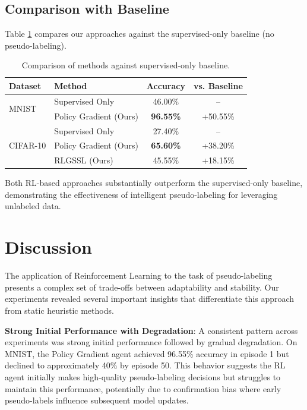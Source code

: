 \documentclass[pdflatex,sn-mathphys-num]{sn-jnl}%
\theoremstyle{thmstyleone}%
\theoremstyle{thmstyletwo}%
\theoremstyle{thmstylethree}%
\begin{document}
\subsection{Comparison with Baseline}
Table \ref{tab:comparison} compares our approaches against the supervised-only baseline (no pseudo-labeling).

\begin{table}[h]
\caption{Comparison of methods against supervised-only baseline.}\label{tab:comparison}
\begin{tabular}{@{}llcc@{}}
\toprule
Dataset & Method & Accuracy & vs. Baseline \\
\midrule
\multirow{2}{*}{MNIST} & Supervised Only & 46.00\% & -- \\
 & Policy Gradient (Ours) & \textbf{96.55\%} & +50.55\% \\
\midrule
\multirow{3}{*}{CIFAR-10} & Supervised Only & 27.40\% & -- \\
 & Policy Gradient (Ours) & \textbf{65.60\%} & +38.20\% \\
 & RLGSSL (Ours) & 45.55\% & +18.15\% \\
\bottomrule
\end{tabular}
\end{table}

Both RL-based approaches substantially outperform the supervised-only baseline, demonstrating the effectiveness of intelligent pseudo-labeling for leveraging unlabeled data.

\section{Discussion}\label{sec:discussion}

The application of Reinforcement Learning to the task of pseudo-labeling presents a complex set of trade-offs between adaptability and stability. Our experiments revealed several important insights that differentiate this approach from static heuristic methods.

\textbf{Strong Initial Performance with Degradation}: A consistent pattern across experiments was strong initial performance followed by gradual degradation. On MNIST, the Policy Gradient agent achieved 96.55\% accuracy in episode 1 but declined to approximately 40\% by episode 50. This behavior suggests the RL agent initially makes high-quality pseudo-labeling decisions but struggles to maintain this performance, potentially due to confirmation bias where early pseudo-labels influence subsequent model updates.
\end{document}
